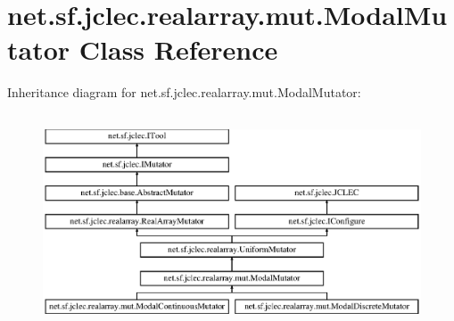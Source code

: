 \hypertarget{classnet_1_1sf_1_1jclec_1_1realarray_1_1mut_1_1_modal_mutator}{\section{net.\-sf.\-jclec.\-realarray.\-mut.\-Modal\-Mutator Class Reference}
\label{classnet_1_1sf_1_1jclec_1_1realarray_1_1mut_1_1_modal_mutator}
}
Inheritance diagram for net.\-sf.\-jclec.\-realarray.\-mut.\-Modal\-Mutator\-:\begin{figure}[H]
\begin{center}
\leavevmode
\includegraphics[height=6.384365cm]{classnet_1_1sf_1_1jclec_1_1realarray_1_1mut_1_1_modal_mutator}
\end{center}
\end{figure}
